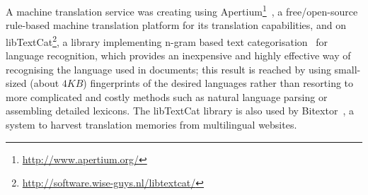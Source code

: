 \documentclass[11pt]{article}
\begin{document}
A machine translation service was creating using Apertium\footnote{\url{http://www.apertium.org/}}~\citep{armentano05p}, a free/open-source rule-based machine translation platform for its translation capabilities, and on libTextCat\footnote{\url{http://software.wise-guys.nl/libtextcat/}}, a library implementing n-gram based text categorisation~\citep{textcat} for language recognition, which provides an inexpensive and highly effective way of recognising the language used in documents; this result is reached by using small-sized (about $4KB$) fingerprints of the desired languages rather than resorting to more complicated and costly methods such as natural language parsing or assembling detailed lexicons. The libTextCat library is also used by Bitextor~\citep{espla-gomis2009bfs}, a system to harvest translation memories from multilingual websites.




\end{document}
